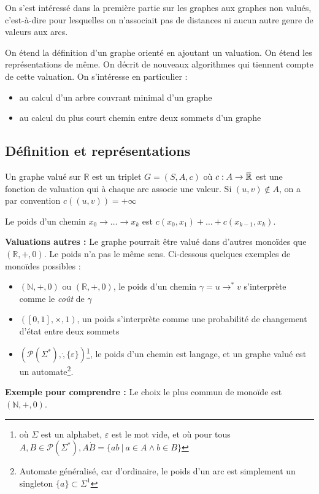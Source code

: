 \documentclass[../../../main.tex]{subfiles}
\begin{document}
On s'est intéressé dans la première partie sur les graphes aux graphes non valués, c'est-à-dire pour lesquelles on n'associait pas de distances ni aucun autre genre de valeurs aux arcs.

On étend la définition d'un graphe orienté en ajoutant un valuation. On étend les représentations de même. On décrit de nouveaux algorithmes qui tiennent compte de cette valuation. On s'intéresse en particulier :
\begin{itemize}
	\item au calcul d'un arbre couvrant minimal d'un graphe
	\item au calcul du plus court chemin entre deux sommets d'un graphe
\end{itemize}
\subsection{Définition et représentations}
 {
	Un graphe valué sur $\mathbb{R}$ est un triplet $G = (S, A, c)$ où $c:A\rightarrow \ols{\mathbb{R}}$ est une fonction de valuation
qui à chaque arc associe une valeur. \newline
Si $(u, v)\notin A$, on a par convention $c((u, v)) = +\infty$\newline

Le poids d'un chemin $x_0\rightarrow \dots \rightarrow x_k$ est $c(x_0, x_1) + \dots + c(x_{k-1} , x_k)$.
}
\textbf{Valuations autres :} Le graphe pourrait être valué dans d'autres monoïdes que $(\mathbb{R}, +, 0)$. Le poids
n'a pas le même sens. Ci-dessous quelques exemples de monoïdes possibles :
\begin{itemize}
	\item $(\mathbb{N}, +, 0)$ ou $(\mathbb{R}, +, 0)$, le poids d'un chemin $\gamma = u\rightarrow^*v$ s'interprète comme le \textit{coût} de $\gamma$
	\item $([0, 1], \times, 1)$, un poids s'interprète comme une probabilité de changement d'état entre deux sommets
	\item $(\mathcal{P}(\Sigma^*), \dot, \{\varepsilon\})$\footnote{où $\Sigma$ est un alphabet, $\varepsilon$ est le mot vide, et où pour tous $A, B\in \mathcal{P}(\Sigma^*), A\dot B = \{ab\ |\ a\in A \wedge b\in B\}$}, le poids d'un chemin est langage, et un graphe valué est un automate\footnote{Automate généralisé, car d'ordinaire, le poids d'un arc est simplement un singleton $\{a\}\subset \Sigma^1$}.
\end{itemize}
\textbf{Exemple pour comprendre :} Le choix le plus commun de monoïde est $(\mathbb{N}, +, 0)$.\newline
\end{document}
